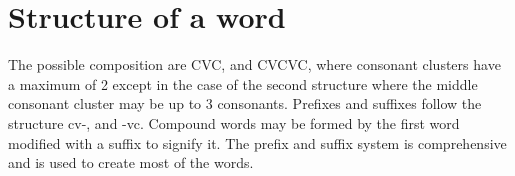 \documentclass{book}
\begin{document}
\section{Structure of a word}
The possible composition are CVC, and CVCVC, where consonant clusters have a maximum of 2 except in the case of the second structure where the middle consonant cluster may be up to 3 consonants.  Prefixes and suffixes follow the structure cv-, and -vc.  Compound words may be formed by the first word modified with a suffix to signify it.  The prefix and suffix system is comprehensive and is used to create most of the words.
\end{document}
